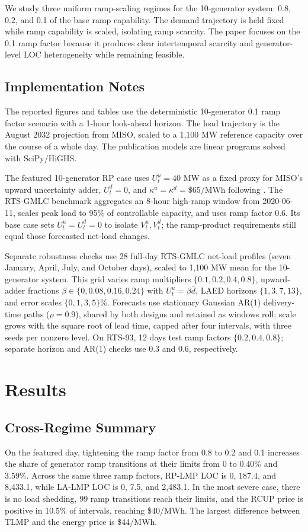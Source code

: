 \documentclass[conference]{IEEEtran}
\begin{document}
We study three uniform ramp-scaling regimes for the 10-generator system: 0.8, 0.2, and 0.1 of the base ramp capability. The demand trajectory is held fixed while ramp capability is scaled, isolating ramp scarcity. The paper focuses on the 0.1 ramp factor because it produces clear intertemporal scarcity and generator-level LOC heterogeneity while remaining feasible.

\subsection{Implementation Notes}
The reported figures and tables use the deterministic 10-generator 0.1 ramp factor scenario with a 1-hour look-ahead horizon. The load trajectory is the August 2032 projection from MISO, scaled to a 1{,}100 MW reference capacity over the course of a whole day. The publication models are linear programs solved with SciPy/HiGHS.

The featured 10-generator RP case uses $U_t^u=40$ MW as a fixed proxy for MISO's upward uncertainty adder, $U_t^d=0$, and $\kappa^u=\kappa^d=\$65/\text{MWh}$ following \cite{Chen2023}. The RTS-GMLC benchmark aggregates an 8-hour high-ramp window from 2020-06-11, scales peak load to 95\% of controllable capacity, and uses ramp factor 0.6. Its base case sets $U_t^u=U_t^d=0$ to isolate $V_t^u,V_t^d$; the ramp-product requirements still equal those forecasted net-load changes.

Separate robustness checks use 28 full-day RTS-GMLC net-load profiles (seven January, April, July, and October days), scaled to 1{,}100 MW mean for the 10-generator system. This grid varies ramp multipliers $\{0.1,0.2,0.4,0.8\}$, upward-adder fractions $\beta\in\{0,0.08,0.16,0.24\}$ with $U_t^u=\beta\bar d$, LAED horizons $\{1,3,7,13\}$, and error scales $\{0,1,3,5\}\%$. Forecasts use stationary Gaussian AR(1) delivery-time paths ($\rho=0.9$), shared by both designs and retained as windows roll; scale grows with the square root of lead time, capped after four intervals, with three seeds per nonzero level. On RTS-93, 12 days test ramp factors $\{0.2,0.4,0.8\}$; separate horizon and AR(1) checks use 0.3 and 0.6, respectively.

\section{Results}
\label{sec:results}
\subsection{Cross-Regime Summary}
On the featured day, tightening the ramp factor from 0.8 to 0.2 and 0.1 increases the share of generator ramp transitions at their limits from 0 to 0.40\% and 3.59\%. Across the same three ramp factors, RP-LMP LOC is 0, 187.4, and 8{,}433.1, while LA-LMP LOC is 0, 7.5, and 2{,}483.1. In the most severe case, there is no load shedding, 99 ramp transitions reach their limits, and the RCUP price is positive in 10.5\% of intervals, reaching \mbox{\$40/MWh}. The largest difference between TLMP and the energy price is \mbox{\$44/MWh}.
\end{document}
